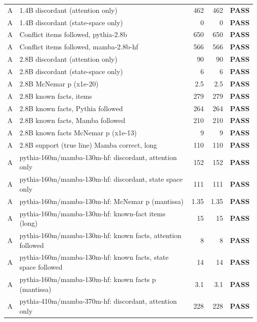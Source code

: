 {\begin{longtable}{@{}cp{8.2cm}rrc@{}}
A & 1.4B discordant (attention only) & 462 & 462 & \textcolor{okgreen}{\textbf{PASS}} \\
A & 1.4B discordant (state-space only) & 0 & 0 & \textcolor{okgreen}{\textbf{PASS}} \\
A & Conflict items followed, pythia-2.8b & 650 & 650 & \textcolor{okgreen}{\textbf{PASS}} \\
A & Conflict items followed, mamba-2.8b-hf & 566 & 566 & \textcolor{okgreen}{\textbf{PASS}} \\
A & 2.8B discordant (attention only) & 90 & 90 & \textcolor{okgreen}{\textbf{PASS}} \\
A & 2.8B discordant (state-space only) & 6 & 6 & \textcolor{okgreen}{\textbf{PASS}} \\
A & 2.8B McNemar p (x1e-20) & 2.5 & 2.5 & \textcolor{okgreen}{\textbf{PASS}} \\
A & 2.8B known facts, items & 279 & 279 & \textcolor{okgreen}{\textbf{PASS}} \\
A & 2.8B known facts, Pythia followed & 264 & 264 & \textcolor{okgreen}{\textbf{PASS}} \\
A & 2.8B known facts, Mamba followed & 210 & 210 & \textcolor{okgreen}{\textbf{PASS}} \\
A & 2.8B known facts McNemar p (x1e-13) & 9 & 9 & \textcolor{okgreen}{\textbf{PASS}} \\
A & 2.8B support (true line) Mamba correct, long & 110 & 110 & \textcolor{okgreen}{\textbf{PASS}} \\
A & pythia-160m/mamba-130m-hf: discordant, attention only & 152 & 152 & \textcolor{okgreen}{\textbf{PASS}} \\
A & pythia-160m/mamba-130m-hf: discordant, state space only & 111 & 111 & \textcolor{okgreen}{\textbf{PASS}} \\
A & pythia-160m/mamba-130m-hf: McNemar p (mantissa) & 1.35 & 1.35 & \textcolor{okgreen}{\textbf{PASS}} \\
A & pythia-160m/mamba-130m-hf: known-fact items (long) & 15 & 15 & \textcolor{okgreen}{\textbf{PASS}} \\
A & pythia-160m/mamba-130m-hf: known facts, attention followed & 8 & 8 & \textcolor{okgreen}{\textbf{PASS}} \\
A & pythia-160m/mamba-130m-hf: known facts, state space followed & 14 & 14 & \textcolor{okgreen}{\textbf{PASS}} \\
A & pythia-160m/mamba-130m-hf: known facts p (mantissa) & 3.1 & 3.1 & \textcolor{okgreen}{\textbf{PASS}} \\
A & pythia-410m/mamba-370m-hf: discordant, attention only & 228 & 228 & \textcolor{okgreen}{\textbf{PASS}} \\

\end{longtable}}
